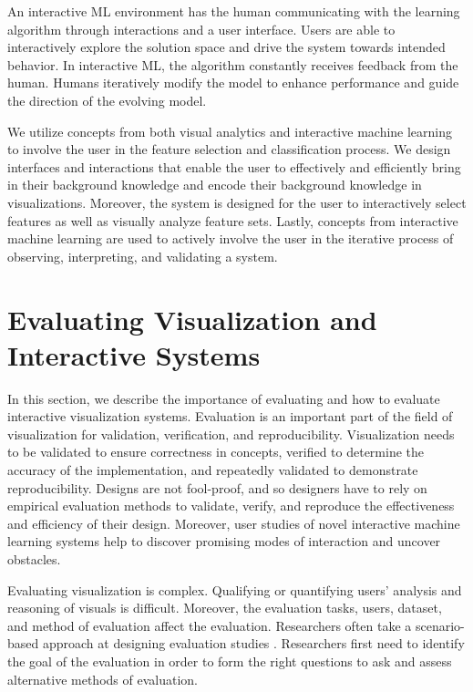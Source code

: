 An interactive ML environment has the human communicating with the learning algorithm through interactions and a user interface. Users are able to interactively explore the solution space and drive the system towards intended behavior. In interactive ML, the algorithm constantly receives feedback from the human. Humans iteratively modify the model to enhance performance and guide the direction of the evolving model.

We utilize concepts from both visual analytics and interactive machine learning to involve the user in the feature selection and classification process. We design interfaces and interactions that enable the user to effectively and efficiently bring in their background knowledge and encode their background knowledge in visualizations. Moreover, the system is designed for the user to interactively select features as well as visually analyze feature sets. Lastly, concepts from interactive machine learning are used to actively involve the user in the iterative process of observing, interpreting, and validating a system. 

\section{Evaluating Visualization and Interactive Systems}
In this section, we describe the importance of evaluating and how to evaluate interactive visualization systems. Evaluation is an important part of the field of visualization for validation, verification, and reproducibility. Visualization needs to be validated to ensure correctness in concepts, verified to determine the accuracy of the implementation, and repeatedly validated to demonstrate reproducibility. Designs are not fool-proof, and so designers have to rely on empirical evaluation methods to validate, verify, and reproduce the effectiveness and efficiency of their design. Moreover, user studies of novel interactive machine learning systems help to discover promising modes of interaction and uncover obstacles.

Evaluating visualization is complex. Qualifying or quantifying users' analysis and reasoning of visuals is difficult. Moreover, the evaluation tasks, users, dataset, and method of evaluation affect the evaluation. Researchers often take a scenario-based approach at designing evaluation studies \cite{Evaluation, Evaluation2}. Researchers first need to identify the goal of the evaluation in order to form the right questions to ask and assess alternative methods of evaluation. 

